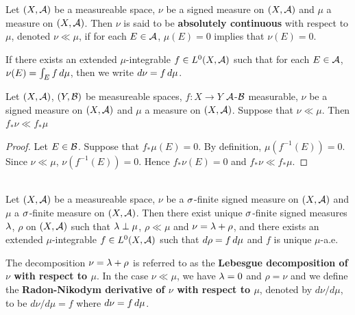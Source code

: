 \documentclass{book}
\begin{document}
	\begin{defn}  
		Let $(X, \mathcal{A})$ be a measureable space, $\nu$ be a signed measure on $(X, \mathcal{A})$ and $\mu$ a measure on $(X,\mathcal{A})$. Then $\nu$ is said to be \textbf{absolutely continuous} with respect to $\mu$, denoted $\nu \ll \mu$, if for each $E \in \mathcal{A}$, $\mu(E) = 0$ implies that $\nu(E) =0$. 
	\end{defn}
	
	\begin{note}
		If there exists an extended $\mu$-integrable $f \in L^0(X, \mathcal{A})$ such that for each $E \in \mathcal{A}$, $\nu(E) = \int_E f \, d \mu$, then we write $d\nu = f \, d \mu$.
	\end{note}
	
	\begin{ex}
	Let $(X, \mathcal{A})$, $(Y, \mathcal{B})$ be measureable spaces, $f:X \rightarrow Y$ $\mathcal{A}$-$\mathcal{B}$ measurable, $\nu$ be a signed measure on $(X, \mathcal{A})$ and $\mu$ a measure on $(X,\mathcal{A})$. Suppose that $\nu \ll \mu$. Then $f_*\nu \ll f_*\mu$
	\end{ex}
	
	\begin{proof}
	Let $E \in \mathcal{B}$. Suppose that $f_*\mu(E) = 0$. By definition, $\mu(f^{-1}(E)) = 0$. Since $\nu \ll \mu$, $\nu(f^{-1}(E)) = 0$. Hence $f_*\nu(E) = 0$ and $f_*\nu \ll f_*\mu$.
	\end{proof}
	
	\begin{thm}  \\
		Let $(X, \mathcal{A})$ be a measureable space, $\nu$ be a $\sigma$-finite signed measure on $(X, \mathcal{A})$ and $\mu$ a $\sigma$-finite measure on $(X,\mathcal{A})$. Then there exist unique $\sigma$-finite signed measures $\lambda$, $\rho$ on $(X, \mathcal{A})$ such that $\lambda \perp \mu$, $\rho \ll \mu$ and $\nu = \lambda + \rho$, and there exists an extended $\mu$-integrable $f \in L^0(X, \mathcal{A})$ such that $d\rho = f \, d \mu$ and $f$ is unique $\mu$-a.e.  
	\end{thm}
	
	\begin{defn}  
		The decomposition $\nu = \lambda + \rho$ is referred to as the \textbf{Lebesgue decomposition of $\nu$ with respect to $\mu$}. In the case $\nu \ll \mu$, we have $\lambda = 0$ and $\rho = \nu$ and we define the \textbf{Radon-Nikodym derivative of $\nu$ with respect to $\mu$}, denoted by $d\nu/d\mu$, to be $d\nu/d\mu = f$ where $d\nu = f\, d \mu$.   
	\end{defn}
	
\end{document}
